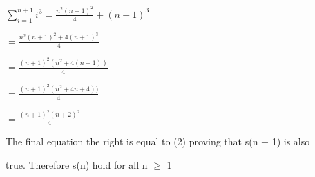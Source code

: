 \documentclass[12pt]{article}
\begin{document}
$\sum_{i=1}^{n+1}i^3 = \frac{n^2(n+1)^2}{4} + (n + 1)^3$\par

\vspace{5mm} %

\hfil $=  \frac{n^2(n+1)^2 + 4(n + 1)^3}{4}$\par

\vspace{5mm} %

\hfil $=  \frac{(n+1)^2(n^2 + 4(n + 1))}{4}$\par

\vspace{5mm} %

\hfil $=  \frac{(n+1)^2(n^2 + 4n + 4))}{4}$\par

\vspace{5mm} %

\hfil $=  \frac{(n+1)^2(n + 2)^2}{4}$\par

\vspace{5mm} %

The final equation the right is equal to (2) proving that s(n + 1) is also\par true.
Therefore s(n) hold for all n $\geq$ 1
\end{document}
